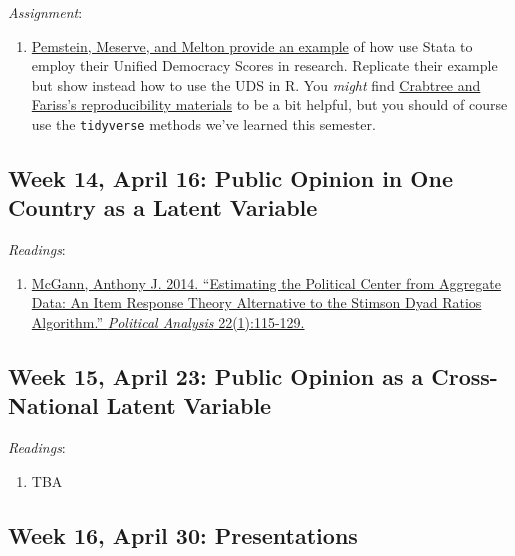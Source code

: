 \documentclass[]{article}
\providecommand{\tightlist}{%
  \setlength{\itemsep}{0pt}\setlength{\parskip}{0pt}}
\begin{document}
\emph{Assignment}:

\begin{enumerate}
\def\labelenumi{\arabic{enumi}.}
\tightlist
\item
  \href{http://www.unified-democracy-scores.org/example.html}{Pemstein,
  Meserve, and Melton provide an example} of how use Stata to employ
  their Unified Democracy Scores in research. Replicate their example
  but show instead how to use the UDS in \textsf{R}. You \emph{might}
  find \href{http://dx.doi.org/10.7910/DVN/LVYOKM}{Crabtree and Fariss's
  reproducibility materials} to be a bit helpful, but you should of
  course use the \texttt{tidyverse} methods we've learned this semester.
\end{enumerate}

\hypertarget{week-14-april-16-public-opinion-in-one-country-as-a-latent-variable}{%
\subsection{Week 14, April 16: Public Opinion in One Country as a Latent
Variable}\label{week-14-april-16-public-opinion-in-one-country-as-a-latent-variable}}

\emph{Readings}:

\begin{enumerate}
\def\labelenumi{\arabic{enumi}.}
\tightlist
\item
  \href{http://pan.oxfordjournals.org.proxy.lib.uiowa.edu/content/22/1/115.abstract}{McGann,
  Anthony J. 2014. ``Estimating the Political Center from Aggregate
  Data: An Item Response Theory Alternative to the Stimson Dyad Ratios
  Algorithm.'' \emph{Political Analysis} 22(1):115-129.}
\end{enumerate}

\hypertarget{week-15-april-23-public-opinion-as-a-cross-national-latent-variable}{%
\subsection{Week 15, April 23: Public Opinion as a Cross-National Latent
Variable}\label{week-15-april-23-public-opinion-as-a-cross-national-latent-variable}}

\emph{Readings}:

\begin{enumerate}
\def\labelenumi{\arabic{enumi}.}
\tightlist
\item
  TBA
\end{enumerate}

\hypertarget{week-16-april-30-presentations}{%
\subsection{Week 16, April 30:
Presentations}\label{week-16-april-30-presentations}}
\end{document}
